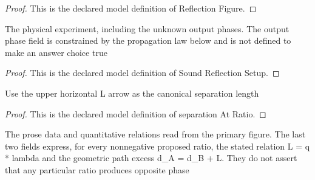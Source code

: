 \begin{proof}
  This is the declared model definition of Reflection Figure.
\end{proof}
\begin{definition}
  \label{def:physics:phyx-mini-0311:phyxminiproblems-problemphyxmini0311-soundreflectionsetup}
  The physical experiment, including the unknown output phases. The output phase field is constrained by the propagation law below and is not defined to make an answer choice true
\end{definition}
\begin{proof}
  This is the declared model definition of Sound Reflection Setup.
\end{proof}
\begin{definition}
  \label{def:physics:phyx-mini-0311:phyxminiproblems-problemphyxmini0311-separationatratio}
  Use the upper horizontal L arrow as the canonical separation length
\end{definition}
\begin{proof}
  This is the declared model definition of separation At Ratio.
\end{proof}
\begin{definition}
  \label{def:physics:phyx-mini-0311:phyxminiproblems-problemphyxmini0311-matchesproblemandfigure}
  The prose data and quantitative relations read from the primary figure. The last two fields express, for every nonnegative proposed ratio, the stated relation L = q * lambda and the geometric path excess d\_A = d\_B + L. They do not assert that any particular ratio produces opposite phase
\end{definition}

